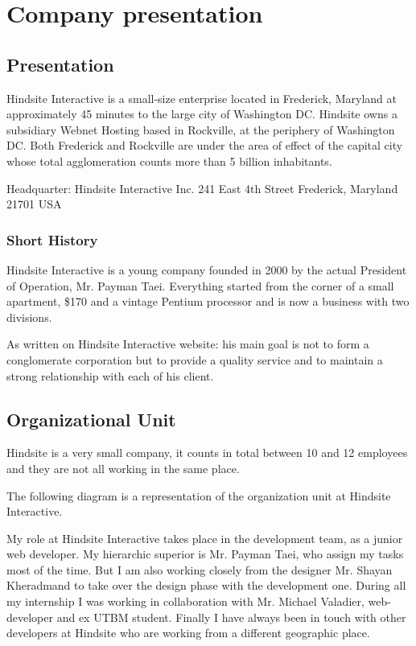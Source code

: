 \chapter{Company presentation}

\section{Presentation}

Hindsite Interactive is a small-size enterprise located in Frederick, Maryland at
approximately 45 minutes to the large city of Washington DC. Hindsite owns a
subsidiary Webnet Hosting based in Rockville, at the periphery of Washington
DC. Both Frederick and Rockville are under the area of effect of the capital
city whose total agglomeration counts more than 5 billion inhabitants.

Headquarter:
Hindsite Interactive Inc.
241 East 4th Street
Frederick, Maryland 21701 USA

\subsection*{Short History}

Hindsite Interactive is a young company founded in 2000 by the actual
President of Operation, Mr. Payman Taei. Everything started from the corner
of a small apartment, \$170 and a vintage Pentium processor and is now a
business with two divisions.

As written on Hindsite Interactive website: his main goal is not to form a
conglomerate corporation but to provide a quality service and to maintain a
strong relationship with each of his client.

\section{Organizational Unit}

Hindsite is a very small company, it counts in total between 10 and 12
employees and they are not all working in the same place.

The following diagram is a representation of the organization unit at Hindsite
Interactive.

My role at Hindsite Interactive takes place in the development team, as a
junior web developer. My hierarchic superior is Mr. Payman Taei, who assign
my tasks most of the time. But I am also working closely from the designer Mr.
Shayan Kheradmand to take over the design phase with the development
one.
During all my internship I was working in collaboration with Mr. Michael
Valadier, web-developer and ex UTBM student.
Finally I have always been in touch with other developers at Hindsite who are
working from a different geographic place.

